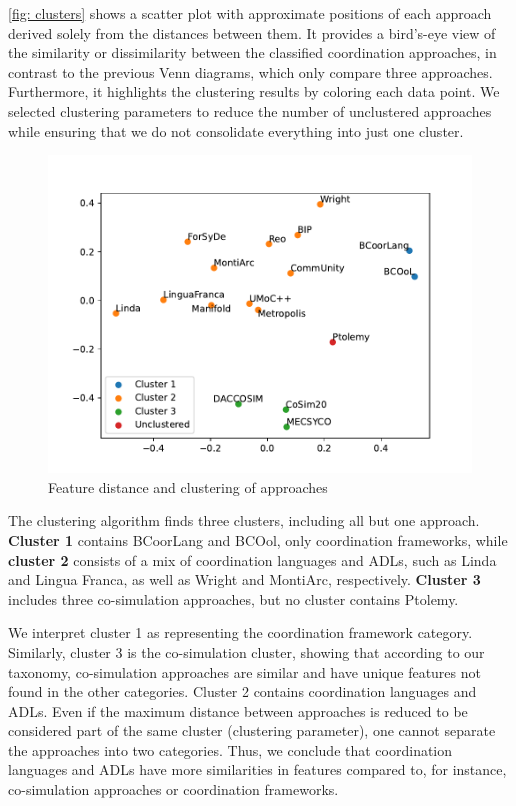 \documentclass[runningheads]{llncs}
\begin{document}
\autoref{fig: clusters} shows a scatter plot with approximate positions of each approach derived solely from the distances between them.
It provides a bird's-eye view of the similarity or dissimilarity between the classified coordination approaches, in contrast to the previous Venn diagrams, which only compare three approaches.
Furthermore, it highlights the clustering results by coloring each data point.
We selected clustering parameters to reduce the number of unclustered approaches while ensuring that we do not consolidate everything into just one cluster.

\begin{figure}[ht]
	\centering
	\includegraphics[width=1\textwidth]{images/approach_scatter}
	\caption{Feature distance and clustering of approaches}
	\label{fig: clusters}
\end{figure}

The clustering algorithm finds three clusters, including all but one approach.
\textbf{Cluster 1} contains BCoorLang and BCOol, only coordination frameworks, while \textbf{cluster 2} consists of a mix of coordination languages and ADLs, such as Linda and Lingua Franca, as well as Wright and MontiArc, respectively.
\textbf{Cluster 3} includes three co-simulation approaches, but no cluster contains Ptolemy.

We interpret cluster 1 as representing the coordination framework category.
Similarly, cluster 3 is the co-simulation cluster, showing that according to our taxonomy, co-simulation approaches are similar and have unique features not found in the other categories.
Cluster 2 contains coordination languages and ADLs.
Even if the maximum distance between approaches is reduced to be considered part of the same cluster (clustering parameter), one cannot separate the approaches into two categories.
Thus, we conclude that coordination languages and ADLs have more similarities in features compared to, for instance, co-simulation approaches or coordination frameworks.
\end{document}
